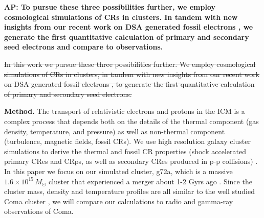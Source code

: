 \documentclass[useAMS,usenatbib]{mn2e}
\def\AP#1{{\bf  AP: #1}}
\begin{document}
\AP{To pursue these three possibilities further, we employ cosmological
  simulations of CRs in clusters. In tandem with new insights from our
  recent work on DSA generated fossil electrons \citep{pinzke13}, we
  generate the first quantitative calculation of primary and secondary
  seed electrons and compare to observations.}

\sout{In this work we pursue these three possibilities further. We
  employ cosmological simulations of CRs in clusters, in tandem with
  new insights from our recent work on DSA generated fossil electrons
  , to generate the first quantitative calculation of
  primary and secondary seed electrons.}

{\bf Method.}  The transport of relativistic electrons and protons in
the ICM is a complex process that depends both on the details of the
thermal component (gas density, temperature, and pressure) as well as
non-thermal component (turbulence, magnetic fields, fossil CRs). We
use high resolution galaxy cluster simulations to derive the thermal
and fossil CR properties (shock accelerated primary CRes and CRps, as
well as secondary CRes produced in p-p collisions)
\citep{2007MNRAS.378..385P,pfrommer08,pinzke10,pinzke13}. In this
paper we focus on our simulated cluster, g72a, which is a massive
$1.6\times10^{15}\,M_\odot$ cluster that experienced a merger about
1-2 Gyrs ago \citep{2009MNRAS.399..497D}. Since the cluster mass,
density and temperature profiles are all similar to the well studied
Coma cluster \citep{2007MNRAS.378..385P,pinzke10}, we will compare our
calculations to radio and gamma-ray observations of Coma.
\end{document}
